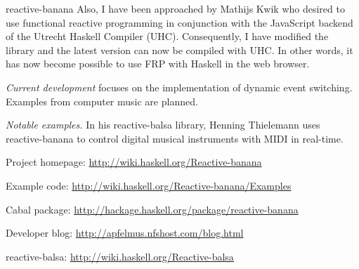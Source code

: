 \begin{hcarentry}[updated]{reactive-banana}
Also, I have been approached by Mathijs Kwik who desired to use functional reactive programming in conjunction with the JavaScript backend of the Utrecht Haskell Compiler (UHC). Consequently, I have modified the library and the latest version can now be compiled with UHC. In other words, it has now become possible to use FRP with Haskell in the web browser.

\emph{Current development} focuses on the implementation of dynamic event switching. Examples from computer music are planned.

\emph{Notable examples.} In his reactive-balsa library, Henning Thielemann uses reactive-banana to control digital musical instruments with MIDI in real-time.

\FurtherReading
\begin{compactitem}
\item Project homepage: \url{http://wiki.haskell.org/Reactive-banana}
\item Example code: \url{http://wiki.haskell.org/Reactive-banana/Examples}
\item Cabal package: \url{http://hackage.haskell.org/package/reactive-banana}
\item Developer blog:  \url{http://apfelmus.nfshost.com/blog.html}
\item reactive-balsa: \url{http://wiki.haskell.org/Reactive-balsa}
\end{compactitem}
\end{hcarentry}
